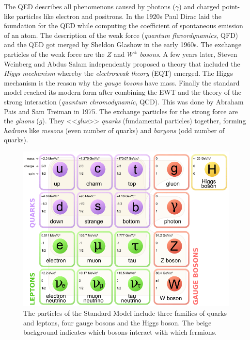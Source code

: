 \documentclass[a4paper,11pt,twosided,final,german,openbib,pdftex,listof=totoc,bibliography=totoc]{scrbook}
\begin{document}
The QED describes all phenomenons caused by photons ($\gamma$) and charged point-like particles like electron and positrons. In the 1920s Paul Dirac laid the foundation for the QED while computing the coefficient of spontaneous emission of an atom. The description of the weak force (\textit{quantum flavordynamics}, QFD) and the QED got merged by Sheldon Glashow in the early 1960s. The exchange particles of the weak force are the $Z$ and $W^{\pm}$ \textit{bosons}. A few years later, Steven Weinberg and Abdus Salam independently proposed a theory that included the \textit{Higgs mechanism} whereby the \textit{electroweak theory} (EQT) emerged. The Higgs mechanism is the reason why the \textit{gauge bosons} have mass.
Finally the standard model reached its modern form after combining the EWT and the theory of the strong interaction (\textit{quantum chromodynamic}, QCD). This was done by Abraham Pais and Sam Treiman in 1975. The exchange particles for the strong force are the \textit{gluons} ($g$). They <<\textit{glue}>> \textit{quarks} (fundamental particles) together, forming \textit{hadrons} like \textit{mesons} (even number of quarks) and \textit{baryons} (odd number of quarks). \cite{RiseStandard} \\ 

\begin{figure}[h!]
	\centering
	\includegraphics[width=\textwidth]{Bilder/SM.png}
	\caption[Standard Model]{The particles of the Standard Model include three families of quarks and leptons, four gauge bosons and the Higgs boson. The beige background indicates which bosons interact with which fermions. \cite{SMFigure}}
	\label{fig:SM}
\end{figure}
\end{document}
